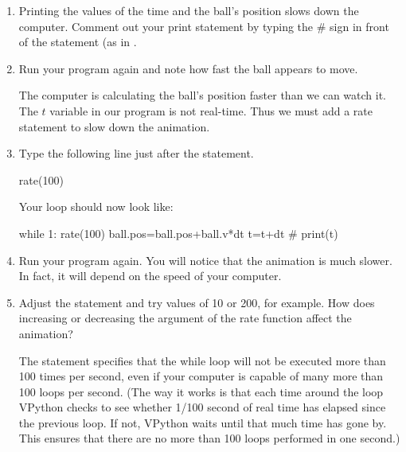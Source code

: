 \begin{enumerate}
\item Printing the values of the time and the ball's position slows down the computer. Comment out your print statement by typing the \# sign in front of the  statement (as in .

\item Run your program again and note how fast the ball appears to move. 

The computer is calculating the ball's position faster than we can watch it. The $t$ variable in our program is not real-time. Thus we must add a rate statement to slow down the animation.

\item Type the following line just after the  statement.

\begin{myvpython}
	rate(100)
\end{myvpython}

Your  loop should now look like:


\begin{myvpython}
while 1:
	rate(100)
	ball.pos=ball.pos+ball.v*dt
	t=t+dt
#	print(t)
\end{myvpython}


\item Run your program again. You will notice that the animation is much slower. In fact, it will depend on the speed of your computer. 

\item Adjust the  statement and try values of 10 or 200, for example. How does increasing or decreasing the argument of the rate function affect the animation?

The  statement specifies that the while loop will not be executed more than 100 times per second, even if your computer is capable of many more than 100 loops per second. (The way it works is that each time around the loop VPython checks to see whether 1/100 second of real time has elapsed since the previous loop. If not, VPython waits until that much time has gone by. This ensures that there are no more than 100 loops performed in one second.)

\end{enumerate}

\ \\

\newpage


\analysis

